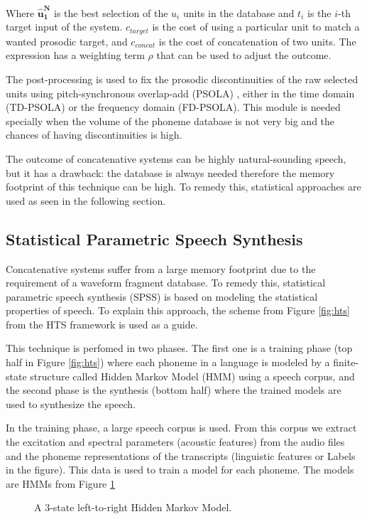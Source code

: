 Where $\mathbf{\hat{u}_1^N}$ is the best selection of the $u_i$ units in the database and $t_i$ is the $i$-th target input of the system. $c_{target}$ is the cost of using a particular unit to match a wanted prosodic target, and $c_{concat}$ is the cost of concatenation of two units. The expression has a weighting term $\rho$ that can be used to adjust the outcome.

The post-processing is used to fix the prosodic discontinuities of the raw selected units using pitch-synchronous overlap-add (PSOLA) \cite{moulines1990pitch}, either in the time domain (TD-PSOLA) or the frequency domain (FD-PSOLA). This module is needed specially when the volume of the phoneme database is not very big and the chances of having discontinuities is high.

The outcome of concatenative systems can be highly natural-sounding speech, but it has a drawback: the database is always needed therefore the memory footprint of this technique can be high. To remedy this, statistical approaches are used as seen in the following section.

\subsection{Statistical Parametric Speech Synthesis}

Concatenative systems suffer from a large memory footprint due to the requirement of a waveform fragment database. To remedy this, statistical parametric speech synthesis (SPSS) is based on modeling the statistical properties of speech. To explain this approach, the scheme from Figure \ref{fig:hts} from the HTS framework \cite{zen2007hmm} is used as a guide.

This technique is perfomed in two phases. The first one is a training phase (top half in Figure \ref{fig:hts}) where each phoneme in a language is modeled by a finite-state structure called Hidden Markov Model (HMM) using a speech corpus, and the second phase is the synthesis (bottom half) where the trained models are used to synthesize the speech.

In the training phase, a large speech corpus is used. From this corpus we extract the excitation and spectral parameters (acoustic features) from the audio files and the phoneme representations of the transcripts (linguistic features or Labels in the figure). This data is used to train a model for each phoneme. The models are HMMs from Figure \ref{fig:hmm}

\begin{figure}[h]
    \centering

    

    \caption{A 3-state left-to-right Hidden Markov Model.}
    \label{fig:hmm}
\end{figure}

